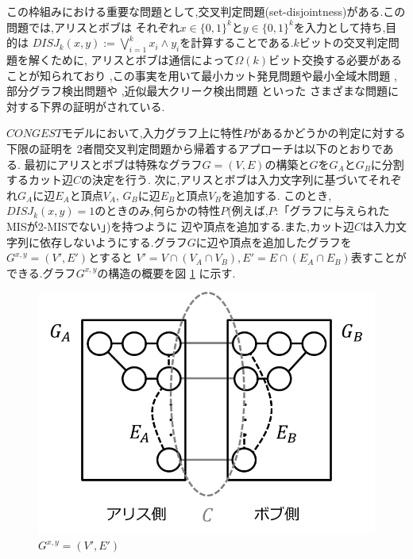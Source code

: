 \documentclass[12pt]{thesis}
\theoremstyle{definition}
\begin{document}
この枠組みにおける重要な問題として,交叉判定問題(set-disjointness)がある.この問題では,アリスとボブは
それぞれ$x \in \{0, 1\}^{k}$と$y \in \{0, 1\}^{k}$を入力として持ち,目的は
$DISJ_{k} (x, y) :=\bigvee_{i = 1}^{k} x_{i} \land y_{i}$を計算することである.$k$ビットの交叉判定問題を解くために,
アリスとボブは通信によって$\Omega (k)$ビット交換する必要があることが知られており 
\cite{kalyanasundaram1992probabilistic},この事実を用いて最小カット発見問題や最小全域木問題 \cite{sarma2012distributed}, 
部分グラフ検出問題や \cite{fischer2018possibilities} ,近似最大クリーク検出問題 \cite{czumaj2020detecting} といった
さまざまな問題に対する下界の証明がされている.

$CONGEST$モデルにおいて,入力グラフ上に特性$P$があるかどうかの判定に対する下限の証明を
2者間交叉判定問題から帰着するアプローチは以下のとおりである.
最初にアリスとボブは特殊なグラフ$G = (V, E)$の構築と$G$を$G_{A}$と$G_{B}$に分割するカット辺$C$の決定を行う.
次に,アリスとボブは入力文字列に基づいてそれぞれ$G_{A}$に辺$E_{A}$と頂点$V_{A}$,
$G_{B}$に辺$E_{B}$と頂点$V_{B}$を追加する.
このとき,$DISJ_{k} (x, y)=1$のときのみ,何らかの特性$P$(例えば,$P$:「グラフに与えられたMISが2-MISでない」)を持つように
辺や頂点を追加する.また,カット辺$C$は入力文字列に依存しないようにする.グラフ$G$に辺や頂点を追加したグラフを
$G^{x, y} = (V', E')$とすると
$V' = V \cap (V_{A} \cap V_{B}), E' = E \cap (E_{A} \cap E_{B})$表すことができる.グラフ$G^{x, y}$の構造の概要を図 \ref{Dif_Gx} に示す.
\begin{figure}[ht]
\begin{center}
\includegraphics[width=120mm]{Dif_Gx.png}
\end{center}
\caption{$G^{x, y} = (V', E')$}
\label{Dif_Gx}
\end{figure}
\end{document}
